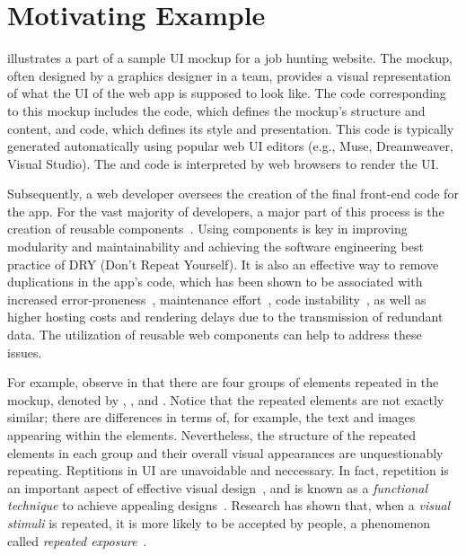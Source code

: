 
\section{Motivating Example}
\label{section:motivating-example}

 illustrates a part of a sample UI mockup for a job hunting website.
The mockup, often designed by a graphics designer in a team, provides a visual representation of what the UI of the web app is supposed to look like.
The code corresponding to this mockup includes the \html code, which defines the mockup's structure and content, and \css code, which defines its style and presentation.
This code is typically generated automatically using popular web UI editors (e.g., Muse, Dreamweaver, Visual Studio).
The \html and \css code is interpreted by web browsers to render the UI.

Subsequently, a web developer oversees the creation of the final front-end code for the app.
For the vast majority of developers, a major part of this process is the creation of reusable components~\cite{StateOfJS:WebPlatformTests}.
Using components is key in improving modularity and maintainability and achieving the software engineering best practice of DRY (Don't Repeat Yourself).
It is also an effective way to remove duplications in the app's code,
which has been shown to be associated with 
increased error-proneness~\cite{Juergens:2009:DoCodeClonesMatter},
maintenance effort~\cite{Lozano:2008:AssessingTheEffectOfClones},
code instability~\cite{Mondal:2012:EmpiricalStudyCloneInstability}, 
as well as higher hosting costs and rendering delays due to the transmission of redundant data.
The utilization of reusable web components can help to address these issues.

For example, observe in  that there are 
four groups of elements repeated in the mockup,
denoted by , ,  and .
Notice that the repeated elements are not exactly similar;
there are differences in terms of, for example, the text and images appearing within the elements.
Nevertheless, the structure of the repeated elements in each group and their overall visual appearances are unquestionably repeating. Reptitions in UI are unavoidable and neccessary. In fact, repetition is an important aspect of effective visual design~\cite{Meggs:1992:TypeAndImageGraphicDesign},
and is known as a \textit{functional technique} 
to achieve appealing designs~\cite{Dondis:1974:VisualLiteracy}.
Research has shown that, when a \textit{visual stimuli} is repeated,
it is more likely to be accepted by people,
a phenomenon called \textit{repeated exposure}~\cite{William:2010:UniversalPrinciplesOfDesign}.

